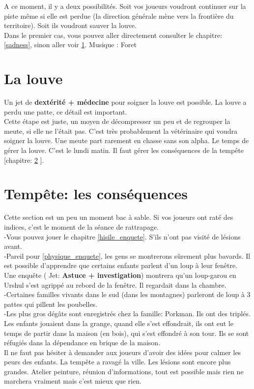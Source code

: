 \documentclass[oneside,12pt]{book}
\newcommand\roll[1]{
( Jet: \textbf{#1})
}
\begin{document}
\begin{flushleft}
A ce moment, il y a deux possibilités. Soit vos joueurs voudront continuer sur la piste même si elle est perdue (la direction générale mène vers la frontière du territoire). Soit ils voudront sauver la louve.\\
Dans le premier cas, vous pouvez aller directement consulter le chapitre: \ref{sadness}, sinon aller voir \ref{louve}.
Musique : Foret 



\section{La louve}
\label{louve}
Un jet de \textbf{dextérité + médecine} pour soigner la louve est possible. 
La louve a perdu une patte, ce détail est important. \\ 
Cette étape est juste, un moyen de décompresser un peu et de regrouper la meute, si elle ne l'était pas. C'est très probablement la vétérinaire qui voudra soigner la louve. Une meute part rarement en chasse sans son alpha. Le temps de gérer la louve. C'est le lundi matin. Il faut gérer les conséquences de la tempête [chapitre: \ref{consequence} ]. \\


\section{Tempête: les conséquences}
\label{consequence}
Cette section est un peu un moment bac à sable. Si vos joueurs ont raté des indices, c'est le moment de la séance de rattrapage. \\
-Vous pouvez jouer le chapitre \ref{hisile_enquete}. S'ils n'ont pas visité de lésions avant.\\
-Pareil pour \ref{physique_enquete}, les gens se montrerons sûrement plus bavards. Il est possible d'apprendre que certains enfants parlent d'un loup à leur fenêtre. Une enquête \roll{Astuce + investigation} montrera qu'un loup-garou en Urshul s'est agrippé au rebord de la fenêtre. Il regardait dans la chambre.\\
-Certaines familles vivants dans le sud (dans les montagnes) parleront de loup à 3 pattes qui pillent les poubelles.\\
-Les plus gros dégâts sont enregistrés chez la famille: Porkman. Ils ont des triplés. Les enfants jouaient dans la grange, quand elle s'est effondrait, 
ils ont eut le temps de partir dans la maison (en bois), qui s'est effondré à son tour. Ils se sont réfugiés dans la dépendance en brique de la maison.\\
Il ne faut pas hésiter à demander aux joueurs d'avoir des idées pour calmer les peurs des enfants. La tempête a ravagé la ville. Les lésions sont encore plus grandes. Atelier peinture, réunion d'informations, tout est possible mais rien ne marchera vraiment mais c'est mieux que rien.


\end{flushleft}
\end{document}
